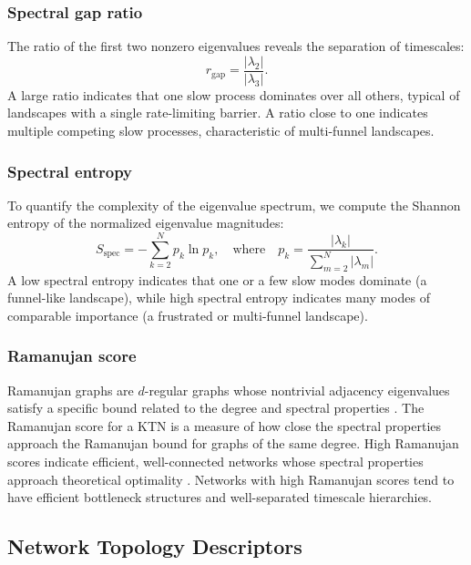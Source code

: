 \subsubsection{Spectral gap ratio}

The ratio of the first two nonzero eigenvalues reveals the separation of timescales:
\begin{equation}
  r_{\mathrm{gap}} = \frac{|\lambda_2|}{|\lambda_3|}.
\end{equation}
A large ratio indicates that one slow process dominates over all others, typical of
landscapes with a single rate-limiting barrier. A ratio close to one indicates multiple
competing slow processes, characteristic of multi-funnel landscapes.

\subsubsection{Spectral entropy}

To quantify the complexity of the eigenvalue spectrum, we compute the Shannon entropy
of the normalized eigenvalue magnitudes:
\begin{equation}
  S_{\mathrm{spec}} = -\sum_{k=2}^{N} p_k \ln p_k, \quad \text{where} \quad p_k = \frac{|\lambda_k|}{\sum_{m=2}^{N} |\lambda_m|}.
\end{equation}
A low spectral entropy indicates that one or a few slow modes dominate (a funnel-like
landscape), while high spectral entropy indicates many modes of comparable importance
(a frustrated or multi-funnel landscape).

\subsubsection{Ramanujan score}

Ramanujan graphs are $d$-regular graphs whose nontrivial adjacency eigenvalues satisfy a
specific bound related to the degree and spectral properties
\cite{Lubotzky1988Ramanujan,Murty2003RamanujanSurvey}. The Ramanujan score for a KTN
is a measure of how close the spectral properties approach the Ramanujan bound for
graphs of the same degree. High Ramanujan scores indicate efficient, well-connected
networks whose spectral properties approach theoretical optimality
\cite{Venkatasubramanian2017Teleodynamics}. Networks with high Ramanujan scores tend
to have efficient bottleneck structures and well-separated timescale hierarchies.


\subsection{Network Topology Descriptors}\label{subsec:topology}

